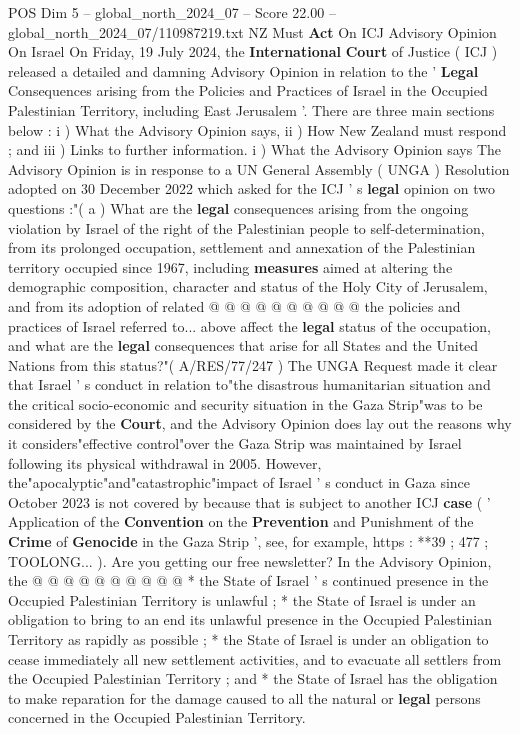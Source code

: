 \begin{textsample}{POS Dim 5 – global\_north\_2024\_07 – Score 22.00 – global\_north\_2024\_07/110987219.txt}  \label{ex:f5_pos_301}
NZ Must \textbf{Act} On ICJ Advisory Opinion On Israel On Friday, 19 July 2024, the \textbf{International} \textbf{Court} of Justice ( ICJ ) released a detailed and damning Advisory Opinion in relation to the ' \textbf{Legal} Consequences arising from the Policies and Practices of Israel in the Occupied Palestinian Territory, including East Jerusalem '.
There are three main sections below : i ) What the Advisory Opinion says, ii ) How New Zealand must respond ; and iii ) Links to further information. i ) What the Advisory Opinion says The Advisory Opinion is in response to a UN General Assembly ( UNGA ) Resolution adopted on 30 December 2022 which asked for the ICJ ' s \textbf{legal} opinion on two questions :"( a ) What are the \textbf{legal} consequences arising from the ongoing violation by Israel of the right of the Palestinian people to self-determination, from its prolonged occupation, settlement and annexation of the Palestinian territory occupied since 1967, including \textbf{measures} aimed at altering the demographic composition, character and status of the Holy City of Jerusalem, and from its adoption of related @ @ @ @ @ @ @ @ @ @ the policies and practices of Israel referred to... above affect the \textbf{legal} status of the occupation, and what are the \textbf{legal} consequences that arise for all States and the United Nations from this status?"( A/RES/77/247 ) The UNGA Request made it clear that Israel ' s conduct in relation to"the disastrous humanitarian situation and the critical socio-economic and security situation in the Gaza Strip"was to be considered by the \textbf{Court}, and the Advisory Opinion does lay out the reasons why it considers"effective control"over the Gaza Strip was maintained by Israel following its physical withdrawal in 2005.
However, the"apocalyptic"and"catastrophic"impact of Israel ' s conduct in Gaza since October 2023 is not covered by because that is subject to another ICJ \textbf{case} ( ' Application of the \textbf{Convention} on the \textbf{Prevention} and Punishment of the \textbf{Crime} of \textbf{Genocide} in the Gaza Strip ', see, for example, https : **39 ; 477 ; TOOLONG... ).
Are you getting our free newsletter?
In the Advisory Opinion, the @ @ @ @ @ @ @ @ @ @ * the State of Israel ' s continued presence in the Occupied Palestinian Territory is unlawful ; * the State of Israel is under an obligation to bring to an end its unlawful presence in the Occupied Palestinian Territory as rapidly as possible ; * the State of Israel is under an obligation to cease immediately all new settlement activities, and to evacuate all settlers from the Occupied Palestinian Territory ; and * the State of Israel has the obligation to make reparation for the damage caused to all the natural or \textbf{legal} persons concerned in the Occupied Palestinian Territory.

\end{textsample}
